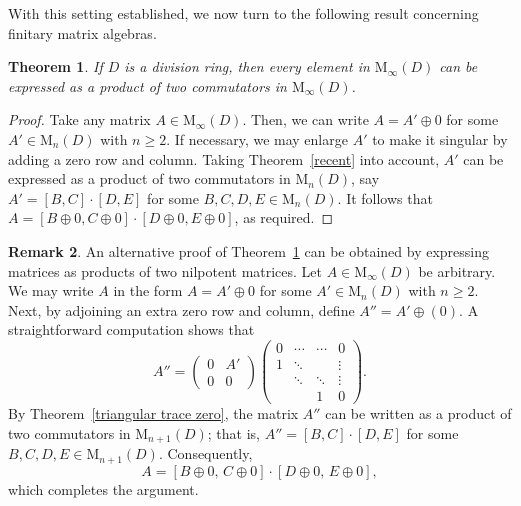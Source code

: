 \documentclass[11pt]{article}
\newtheorem{theorem}{Theorem}
\theoremstyle{definition}
\newtheorem{remark}[theorem]{Remark}%
\begin{document}
{{{{				With this setting established, we now turn to the following result concerning finitary matrix algebras.
				
				\begin{theorem}\label{finitary1}
					If $D$ is a division ring, then every element in $\mathrm{M}_\infty(D)$ can be expressed as a product of two commutators in $\mathrm{M}_\infty(D)$.
				\end{theorem}
				
				\begin{proof}
					Take any matrix \( A \in \mathrm{M}_\infty(D) \). Then, we can write \( A = A' \oplus 0 \) for some \( A' \in \mathrm{M}_n(D) \) with \( n \geq 2 \). If necessary, we may enlarge \( A' \) to make it singular by adding a zero row and column. Taking Theorem~\ref{recent} into account, \( A' \) can be expressed as a product of two commutators in \( \mathrm{M}_n(D) \), say \( A' = [B, C]\cdot [D,E] \) for some $B,C,D,E\in\mathrm{M}_n(D)$. It follows that \( A = [B \oplus 0, C \oplus 0]\cdot[D \oplus 0, E \oplus 0] \), as required.
				\end{proof}
				
				\begin{remark}
					An alternative proof of Theorem~\ref{finitary1} can be obtained by expressing matrices as products of two nilpotent matrices.
					Let $A \in \mathrm{M}_\infty(D)$ be arbitrary. We may write $A$ in the form $A = A' \oplus 0$ for some $A' \in \mathrm{M}_n(D)$ with $n \ge 2$.
					Next, by adjoining an extra zero row and column, define $A'' = A' \oplus (0)$.
					A straightforward computation shows that
					\[
					A'' =
					\begin{pmatrix}
						0 & A' \\
						0 & 0
					\end{pmatrix}
					\begin{pmatrix}
						0 & \cdots & \cdots & 0 \\
						1 & \ddots &        & \vdots \\
						& \ddots & \ddots & \vdots \\
						&        & 1      & 0
					\end{pmatrix}.
					\]
					By Theorem~\ref{triangular trace zero}, the matrix $A''$ can be written as a product of two commutators in $\mathrm{M}_{n+1}(D)$; that is,
					$A'' = [B, C] \cdot [D, E]$
					for some $B, C, D, E \in \mathrm{M}_{n+1}(D)$.
					Consequently,
					$$
					A = [B \oplus 0,\, C \oplus 0] \cdot [D \oplus 0,\, E \oplus 0],
					$$
					which completes the argument.
				\end{remark}
				
}}}}
\end{document}
